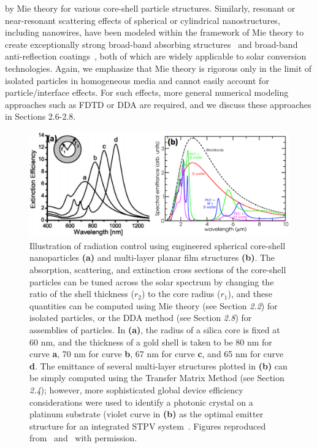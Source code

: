 \documentclass[10pt,letterpaper]{article}
\begin{document}
by Mie theory for various core-shell particle structures.  
Similarly, resonant or near-resonant scattering effects of spherical or cylindrical 
nanostructures, including nanowires, have been modeled within the framework of Mie theory to create exceptionally strong broad-band absorbing structures~\cite{FKA_OptExp_2014}
and broad-band anti-reflection coatings~\cite{SVP_NatComm_2012}, both of which are 
widely applicable to solar conversion technologies.  Again, we emphasize 
that Mie theory is rigorous only in the limit of isolated particles 
in homogeneous media
and cannot easily account for particle/interface effects.
For such effects, more general numerical modeling approaches such as FDTD or DDA are required, and we discuss these approaches in Sections 2.6-2.8.

\begin{figure}[ht]
\begin{center}
        \includegraphics[width=\textwidth]{Halas_Celanovic}
        \caption{\label{Halas}  Illustration of radiation control using engineered spherical core-shell
nanoparticles {\bf (a)} and multi-layer planar film structures {\bf (b)}.
The absorption, scattering, and extinction cross sections of the core-shell particles can be tuned
across the solar spectrum by changing the ratio of the shell thickness ($r_2$) to the core radius ($r_1$), 
and these
quantities can be computed using Mie theory (see Section {\it 2.2}) for isolated particles, or the 
DDA method (see Section {\it 2.8}) for assemblies of particles.
In {\bf (a)}, the radius of a silica core is fixed at 60 nm, and the thickness of a gold shell is
taken to be 80 nm for curve {\bf a},
70 nm for curve {\bf b}, 67 nm for curve {\bf c}, and 65 nm for curve {\bf d}.
The emittance of several multi-layer structures plotted in {\bf (b)} can be simply computed
using the Transfer Matrix Method (see Section {\it 2.4}); however, 
more sophisticated global device
efficiency considerations were used to identify a photonic crystal on a platinum substrate 
(violet curve in {\bf (b)} as the optimal emitter structure for
an integrated STPV system~\cite{g4}.
Figures reproduced from~\cite{CH_APL_2006} and~\cite{g4} with permission.}
\end{center}
\end{figure}
\end{document}
